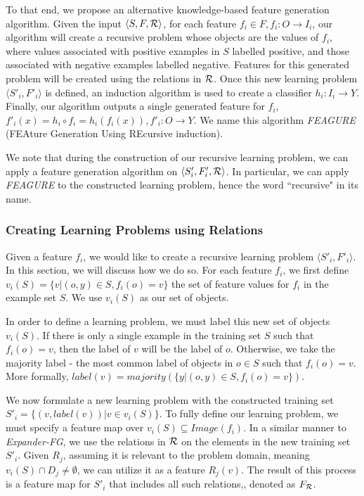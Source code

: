 \documentclass{article}
\theoremstyle{definition}
\begin{document}
To that end, we propose an alternative knowledge-based feature generation algorithm. Given the input $\langle S,F,{\cal R} \rangle$, for each feature $f_i\in F, f_i:O\rightarrow I_i$, our algorithm will create a recursive problem whose objects are the values of $f_i$, where values associated with positive examples in $S$ labelled positive, and those associated with negative examples labelled negative. Features for this generated problem will be created using the relations in ${\cal R}$. Once this new learning problem $\langle S'_i,F'_i\rangle$ is defined, an induction algorithm is used to create a classifier $h_i:I_i\rightarrow Y$. Finally, our algorithm outputs a single generated feature for $f_i$, $f'_i(x)=h_i\circ f_i=h_i(f_i(x)), f'_i:O\rightarrow Y$.
We name this algorithm \emph{FEAGURE} (FEAture Generation Using REcursive induction).

We note that during the construction of our recursive learning problem, we can apply a feature generation algorithm on $\langle S'_i,F'_i,{\cal R} \rangle$. In particular, we can apply \emph{FEAGURE} to the constructed learning problem, hence the word ``recursive" in its name.

\subsubsection{Creating Learning Problems using Relations}  

Given a feature $f_{i}$, we would like to create a recursive learning problem $\langle S'_i,F'_i \rangle$. In this section, we will discuss how we do so.
For each feature $f_{i}$, we first define $v_i(S) = \{v | (o,y) \in S, f_{i}(o)=v\}$ the set of feature values for $f_i$ in the example set $S$. %
We use $v_i(S)$ as our set of objects.

In order to define a learning problem, we must label this new set of objects $v_i(S)$. If there is only a single example in the training set $S$ such that $f_i(o)=v$, then the label of $v$ will be the label of $o$. Otherwise, we take the majority label - the most common label of objects in $o\in S$ such that $f_i(o)=v$. More formally, $label(v)=majority(\{y|(o,y)\in S, f_i(o)=v\})$.

We now formulate a new learning problem with the constructed training set
$S'_i = \{ (v, label(v)) | v \in v_i(S) \}$.
To fully define our learning problem, we must specify a feature map over $v_i(S)\subseteq Image(f_i)$. In a similar manner to \emph{Expander-FG}, we use the relations in ${\cal R}$ on the elements in the new training set $S'_i$.
Given $R_j$, assuming it is relevant to the problem domain, meaning $v_i(S)\cap D_j\neq\emptyset$, we can utilize it as a feature $R_j(v)$. 
The result of this process is a feature map for $S'_i$ that includes all such relations,, denoted as $F_{\cal R}$. %
\end{document}
